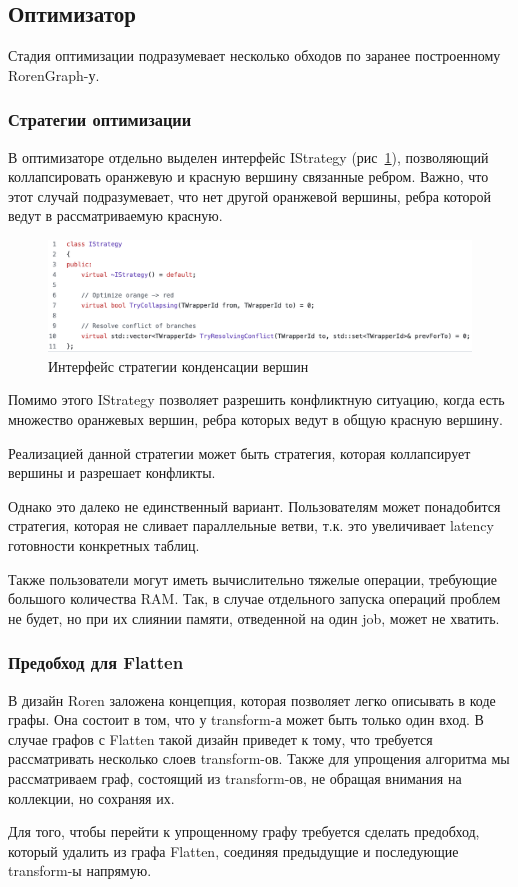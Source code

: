 \subsection{Оптимизатор}

Стадия оптимизации подразумевает несколько обходов по заранее построенному RorenGraph-у.

\subsubsection{Стратегии оптимизации}

В оптимизаторе отдельно выделен интерфейс IStrategy (рис~\ref{fig:strat}), позволяющий коллапсировать оранжевую и красную вершину связанные ребром. Важно, что этот случай подразумевает, что нет другой оранжевой вершины, ребра которой ведут в рассматриваемую красную.

\begin{figure}[h]
    \centering
    \includegraphics[width=\textwidth]{img/strat.png}
    \caption{Интерфейс стратегии конденсации вершин}
    \label{fig:strat}
\end{figure}

Помимо этого IStrategy позволяет разрешить конфликтную ситуацию, когда есть множество оранжевых вершин, ребра которых ведут в общую красную вершину.

Реализацией данной стратегии может быть стратегия, которая коллапсирует вершины и разрешает конфликты.

Однако это далеко не единственный вариант. Пользователям может понадобится стратегия, которая не сливает параллельные ветви, т.к. это увеличивает latency готовности конкретных таблиц.

Также пользователи могут иметь вычислительно тяжелые операции, требующие большого количества RAM. Так, в случае отдельного запуска операций проблем не будет, но при их слиянии памяти, отведенной на один job, может не хватить.

\newpage
\subsubsection{Предобход для Flatten}

В дизайн Roren заложена концепция, которая позволяет легко описывать в коде графы. Она состоит в том, что у transform-а может быть только один вход. В случае графов с Flatten такой дизайн приведет к тому, что требуется рассматривать несколько слоев transform-ов. Также для упрощения алгоритма мы рассматриваем граф, состоящий из transform-ов, не обращая внимания на коллекции, но сохраняя их.

Для того, чтобы перейти к упрощенному графу требуется сделать предобход, который удалить из графа Flatten, соединяя предыдущие и последующие transform-ы напрямую.
